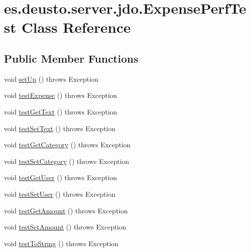 \hypertarget{classes_1_1deusto_1_1server_1_1jdo_1_1_expense_perf_test}{}\section{es.\+deusto.\+server.\+jdo.\+Expense\+Perf\+Test Class Reference}
\label{classes_1_1deusto_1_1server_1_1jdo_1_1_expense_perf_test}
\subsection*{Public Member Functions}
\begin{DoxyCompactItemize}
\item 
void \hyperlink{classes_1_1deusto_1_1server_1_1jdo_1_1_expense_perf_test_a0e502f9886deb99f4b0ba6b31a546996}{set\+Up} ()  throws Exception 
\item 
void \hyperlink{classes_1_1deusto_1_1server_1_1jdo_1_1_expense_perf_test_ae31bef49b4d03ba25a303945ffadedad}{test\+Expense} ()  throws Exception 
\item 
void \hyperlink{classes_1_1deusto_1_1server_1_1jdo_1_1_expense_perf_test_a655751993f97c058c67931ae1df92fe5}{test\+Get\+Text} ()  throws Exception 
\item 
void \hyperlink{classes_1_1deusto_1_1server_1_1jdo_1_1_expense_perf_test_a17c0cf189f685579b1d74139939956d5}{test\+Set\+Text} ()  throws Exception 
\item 
void \hyperlink{classes_1_1deusto_1_1server_1_1jdo_1_1_expense_perf_test_ae01a7e173ed07a7a15fb1b9a026dab84}{test\+Get\+Category} ()  throws Exception 
\item 
void \hyperlink{classes_1_1deusto_1_1server_1_1jdo_1_1_expense_perf_test_aae4c6f0354a5537b29594b4b6d75818b}{test\+Set\+Category} ()  throws Exception 
\item 
void \hyperlink{classes_1_1deusto_1_1server_1_1jdo_1_1_expense_perf_test_a3de2e2071935d39495c7fc4e1820fe8b}{test\+Get\+User} ()  throws Exception 
\item 
void \hyperlink{classes_1_1deusto_1_1server_1_1jdo_1_1_expense_perf_test_afd633402806a32f1792407b620aac675}{test\+Set\+User} ()  throws Exception 
\item 
void \hyperlink{classes_1_1deusto_1_1server_1_1jdo_1_1_expense_perf_test_ad3a01da45d045f9ea58673eb6aecbc7b}{test\+Get\+Amount} ()  throws Exception 
\item 
void \hyperlink{classes_1_1deusto_1_1server_1_1jdo_1_1_expense_perf_test_abf38be98f3435425dd0b97940d933e5f}{test\+Set\+Amount} ()  throws Exception 
\item 
void \hyperlink{classes_1_1deusto_1_1server_1_1jdo_1_1_expense_perf_test_aceacce2fc2defc16179d2aa2cde8f9df}{test\+To\+String} ()  throws Exception
\end{DoxyCompactItemize}


